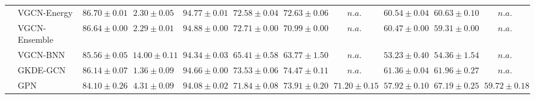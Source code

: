 \begin{table*}[!h]
{\begin{tabular}{ll|cc|cccc|ccc}
        & VGCN-Energy & ${86.70\scriptscriptstyle \pm 0.01}$ & ${2.30\scriptscriptstyle \pm 0.05}$ & ${94.77\scriptscriptstyle \pm 0.01}$ & ${72.58\scriptscriptstyle \pm 0.04}$ & ${72.63\scriptscriptstyle \pm 0.06}$ & $n.a.$ & ${60.54\scriptscriptstyle \pm 0.04}$ & ${60.63\scriptscriptstyle \pm 0.10}$ & $n.a.$\\
        & VGCN-Ensemble & ${86.64\scriptscriptstyle \pm 0.00}$ & ${2.29\scriptscriptstyle \pm 0.01}$ & ${\mathbf{94.88}\scriptscriptstyle \pm 0.00}$ & ${72.71\scriptscriptstyle \pm 0.00}$ & ${70.99\scriptscriptstyle \pm 0.00}$ & $n.a.$ & ${60.47\scriptscriptstyle \pm 0.00}$ & ${59.31\scriptscriptstyle \pm 0.00}$ & $n.a.$\\
        & VGCN-BNN & ${85.56\scriptscriptstyle \pm 0.05}$ & ${14.00\scriptscriptstyle \pm 0.11}$ & ${94.34\scriptscriptstyle \pm 0.03}$ & ${65.41\scriptscriptstyle \pm 0.58}$ & ${63.77\scriptscriptstyle \pm 1.50}$ & $n.a.$ & ${53.23\scriptscriptstyle \pm 0.40}$ & ${54.36\scriptscriptstyle \pm 1.54}$ & $n.a.$\\
        & GKDE-GCN & ${86.14\scriptscriptstyle \pm 0.07}$ & ${\mathbf{1.36}\scriptscriptstyle \pm 0.09}$ & ${94.66\scriptscriptstyle \pm 0.00}$ & ${73.53\scriptscriptstyle \pm 0.06}$ & ${74.47\scriptscriptstyle \pm 0.11}$ & $n.a.$ & ${61.36\scriptscriptstyle \pm 0.04}$ & ${61.96\scriptscriptstyle \pm 0.27}$ & $n.a.$\\
        & GPN & ${84.10\scriptscriptstyle \pm 0.26}$ & ${4.31\scriptscriptstyle \pm 0.09}$ & ${94.08\scriptscriptstyle \pm 0.02}$ & ${71.84\scriptscriptstyle \pm 0.08}$ & ${73.91\scriptscriptstyle \pm 0.20}$ & ${{71.20}\scriptscriptstyle \pm 0.15}$ & ${57.92\scriptscriptstyle \pm 0.10}$ & ${67.19\scriptscriptstyle \pm 0.25}$ & ${{59.72}\scriptscriptstyle \pm 0.18}$\\



\end{tabular}}
\end{table*}
